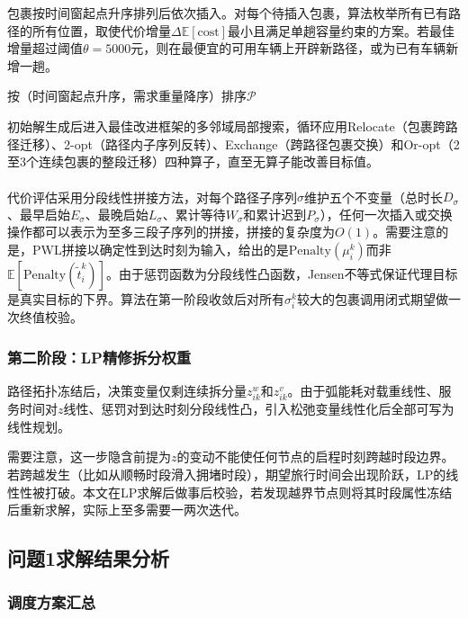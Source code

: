 \documentclass[12pt,a4paper]{article}
\newcommand{\upcite}[1]{\textsuperscript{\textsuperscript{\cite{#1}}}}
\begin{document}
包裹按时间窗起点升序排列后依次插入。对每个待插入包裹，算法枚举所有已有路径的所有位置，取使代价增量$\Delta \mathbb{E}[\text{cost}]$最小且满足单趟容量约束的方案。若最佳增量超过阈值$\theta=5000$元，则在最便宜的可用车辆上开辟新路径，或为已有车辆新增一趟。

\begin{algorithm}[H]
\caption{贪婪插入构造初始解}
按（时间窗起点升序，需求重量降序）排序$\mathcal{P}$\;
\end{algorithm}
初始解生成后进入最佳改进框架的多邻域局部搜索，循环应用Relocate（包裹跨路径迁移）、2-opt（路径内子序列反转）、Exchange（跨路径包裹交换）和Or-opt（2至3个连续包裹的整段迁移）四种算子，直至无算子能改善目标值。

代价评估采用分段线性拼接方法\upcite{vidal2015}，对每个路径子序列$\sigma$维护五个不变量（总时长$D_\sigma$、最早启始$E_\sigma$、最晚启始$L_\sigma$、累计等待$W_\sigma$和累计迟到$P_\sigma$），任何一次插入或交换操作都可以表示为至多三段子序列的拼接，拼接的复杂度为$O(1)$。需要注意的是，PWL拼接以确定性到达时刻为输入，给出的是$\text{Penalty}(\mu_i^k)$而非$\mathbb{E}[\text{Penalty}(\tilde t_i^k)]$。由于惩罚函数为分段线性凸函数，Jensen不等式保证代理目标是真实目标的下界。算法在第一阶段收敛后对所有$\sigma_i^k$较大的包裹调用闭式期望做一次终值校验。

\subsubsection{第二阶段：LP精修拆分权重}
路径拓扑冻结后，决策变量仅剩连续拆分量$z_{ik}^w$和$z_{ik}^v$。由于弧能耗对载重线性、服务时间对$z$线性、惩罚对到达时刻分段线性凸，引入松弛变量线性化后全部可写为线性规划。

需要注意，这一步隐含前提为$z$的变动不能使任何节点的启程时刻跨越时段边界。若跨越发生（比如从顺畅时段滑入拥堵时段），期望旅行时间会出现阶跃，LP的线性性被打破。本文在LP求解后做事后校验，若发现越界节点则将其时段属性冻结后重新求解，实际上至多需要一两次迭代。

\subsection{问题1求解结果分析}
\subsubsection{调度方案汇总}
\end{document}
